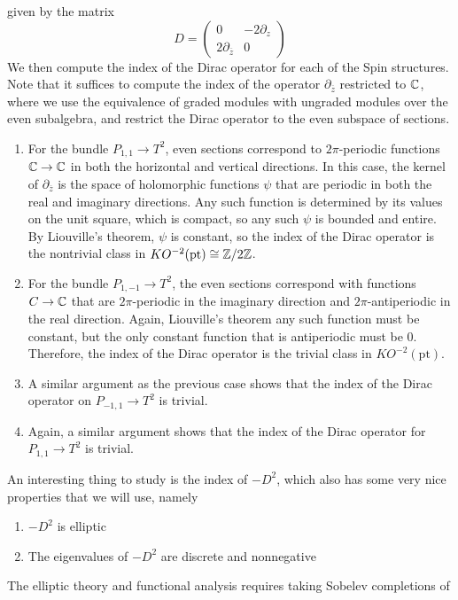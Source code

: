 \begin{exmp}
given by the matrix
\[
D = \begin{pmatrix}
0 & -2\partial_z \\
2\partial_{\overline{z}} & 0
\end{pmatrix}
\]
We then compute the index of the Dirac operator for each of the Spin structures.
Note that it suffices to compute the index of the operator $\partial_{\overline{z}}$
restricted to $\mathbb{C}$, where we use the equivalence of graded modules with ungraded modules
over the even subalgebra, and restrict the Dirac operator to the even subspace
of sections.
\begin{enumerate}
  \item For the bundle $P_{1,1} \to T^2$, even sections correspond to $2\pi$-periodic
  functions $\mathbb{C} \to \mathbb{C}$ in both the horizontal and vertical directions. In this case,
  the kernel of $\partial_{\overline{z}}$ is the space of holomorphic functions
  $\psi$ that are periodic in both the real and imaginary directions. Any such function
  is determined by its values on the unit square, which is compact, so any such
  $\psi$ is bounded and entire. By Liouville's theorem, $\psi$ is constant, so
  the index of the Dirac operator is the nontrivial class in
  $KO^{-2}(\mathrm{pt}) \cong \mathbb{Z}/2\mathbb{Z}$.
  \item For the bundle $P_{1,-1} \to T^2$, the even sections correspond with
  functions $C\to \mathbb{C}$ that are $2\pi$-periodic in the imaginary direction and
  $2\pi$-antiperiodic in the real direction. Again, Liouville's theorem any such
  function must be constant, but the only constant function that is antiperiodic
  must be $0$. Therefore, the index of the Dirac operator is the trivial class
  in $KO^{-2}(\mathrm{pt})$.
  \item A similar argument as the previous case shows that the index of the Dirac
  operator on $P_{-1,1} \to T^2$ is trivial.
  \item Again, a similar argument shows that the index of the Dirac operator
  for $P_{1,1} \to T^2$ is trivial.
\end{enumerate}
\end{exmp}
%
An interesting thing to study is the index of $-D^2$, which also has some very nice
properties that we will use, namely
\begin{enumerate}
  \item $-D^2$ is elliptic
  \item The eigenvalues of $-D^2$ are discrete and nonnegative
\end{enumerate}
%
The elliptic theory and functional analysis requires taking Sobelev completions of

